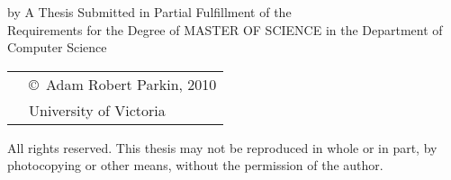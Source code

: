 \pagebreak
{
\centering
\thesistitle
\tpbreak
by
\tpbreak
\nameanddegrees
\tpbreak
A Thesis Submitted in Partial Fulfillment of the \\
Requirements for the Degree of
\tpbreak
MASTER OF SCIENCE
\tpbreak
in the Department of Computer Science\\
\vfill
\begin{tabular}{cl}
& \copyright\ Adam Robert Parkin, 2010\\
& \phantom{\copyright} University of Victoria
\end{tabular}
\tpbreak
All rights reserved. This thesis may not be reproduced in whole or in part, by \\
\hfill photocopying or other means, without the permission of the author. \hfill
}
\pagebreak
